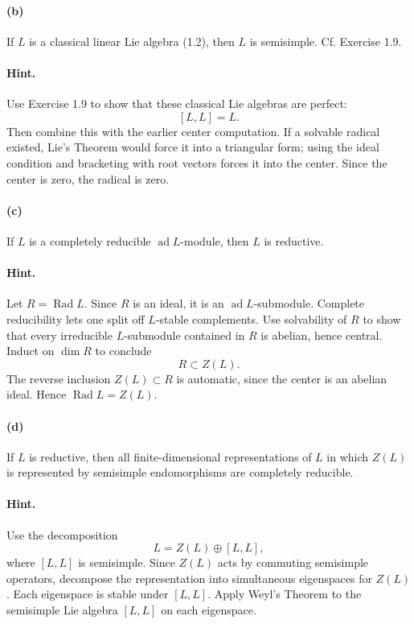 \documentclass[12pt, a4paper]{article}
\begin{document}
\paragraph{(b)}
If \(L\) is a classical linear Lie algebra (1.2), then \(L\) is semisimple.
Cf. Exercise 1.9.

\paragraph{Hint.}
Use Exercise 1.9 to show that these classical Lie algebras are perfect:
\[
[L,L]=L.
\]
Then combine this with the earlier center computation. If a solvable radical
existed, Lie's Theorem would force it into a triangular form; using the ideal
condition and bracketing with root vectors forces it into the center. Since the
center is zero, the radical is zero.

\paragraph{(c)}
If \(L\) is a completely reducible \(\operatorname{ad}L\)-module, then \(L\) is
reductive.

\paragraph{Hint.}
Let \(R=\operatorname{Rad}L\). Since \(R\) is an ideal, it is an
\(\operatorname{ad}L\)-submodule. Complete reducibility lets one split off
\(L\)-stable complements. Use solvability of \(R\) to show that every irreducible
\(L\)-submodule contained in \(R\) is abelian, hence central. Induct on
\(\dim R\) to conclude
\[
R\subset Z(L).
\]
The reverse inclusion \(Z(L)\subset R\) is automatic, since the center is an
abelian ideal. Hence \(\operatorname{Rad}L=Z(L)\).

\paragraph{(d)}
If \(L\) is reductive, then all finite-dimensional representations of \(L\) in
which \(Z(L)\) is represented by semisimple endomorphisms are completely
reducible.

\paragraph{Hint.}
Use the decomposition
\[
L=Z(L)\oplus [L,L],
\]
where \([L,L]\) is semisimple. Since \(Z(L)\) acts by commuting semisimple
operators, decompose the representation into simultaneous eigenspaces for
\(Z(L)\). Each eigenspace is stable under \([L,L]\). Apply Weyl's Theorem to
the semisimple Lie algebra \([L,L]\) on each eigenspace.
\end{document}
